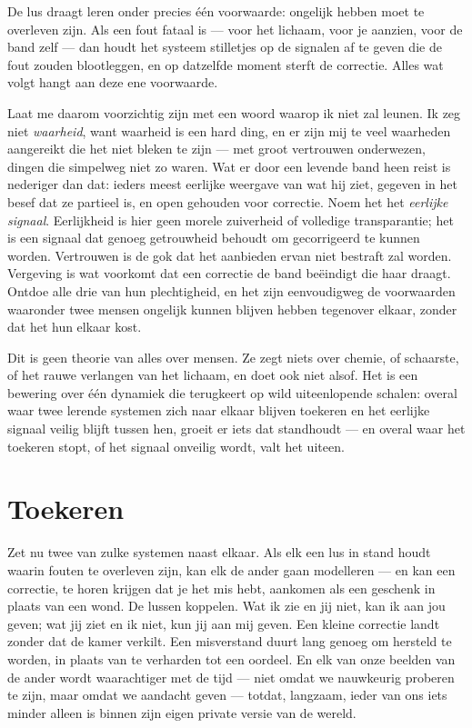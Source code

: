 \documentclass[12pt, a4paper]{article}
\begin{document}
De lus draagt leren onder precies één voorwaarde: ongelijk hebben moet te overleven zijn. Als een fout fataal is — voor het lichaam, voor je aanzien, voor de band zelf — dan houdt het systeem stilletjes op de signalen af te geven die de fout zouden blootleggen, en op datzelfde moment sterft de correctie. Alles wat volgt hangt aan deze ene voorwaarde.

Laat me daarom voorzichtig zijn met een woord waarop ik niet zal leunen. Ik zeg niet \textit{waarheid}, want waarheid is een hard ding, en er zijn mij te veel waarheden aangereikt die het niet bleken te zijn — met groot vertrouwen onderwezen, dingen die simpelweg niet zo waren. Wat er door een levende band heen reist is nederiger dan dat: ieders meest eerlijke weergave van wat hij ziet, gegeven in het besef dat ze partieel is, en open gehouden voor correctie. Noem het het \textit{eerlijke signaal}. Eerlijkheid is hier geen morele zuiverheid of volledige transparantie; het is een signaal dat genoeg getrouwheid behoudt om gecorrigeerd te kunnen worden. Vertrouwen is de gok dat het aanbieden ervan niet bestraft zal worden. Vergeving is wat voorkomt dat een correctie de band beëindigt die haar draagt. Ontdoe alle drie van hun plechtigheid, en het zijn eenvoudigweg de voorwaarden waaronder twee mensen ongelijk kunnen blijven hebben tegenover elkaar, zonder dat het hun elkaar kost.

Dit is geen theorie van alles over mensen. Ze zegt niets over chemie, of schaarste, of het rauwe verlangen van het lichaam, en doet ook niet alsof. Het is een bewering over één dynamiek die terugkeert op wild uiteenlopende schalen: overal waar twee lerende systemen zich naar elkaar blijven toekeren en het eerlijke signaal veilig blijft tussen hen, groeit er iets dat standhoudt — en overal waar het toekeren stopt, of het signaal onveilig wordt, valt het uiteen.

\section*{Toekeren}
Zet nu twee van zulke systemen naast elkaar. Als elk een lus in stand houdt waarin fouten te overleven zijn, kan elk de ander gaan modelleren — en kan een correctie, te horen krijgen dat je het mis hebt, aankomen als een geschenk in plaats van een wond. De lussen koppelen. Wat ik zie en jij niet, kan ik aan jou geven; wat jij ziet en ik niet, kun jij aan mij geven. Een kleine correctie landt zonder dat de kamer verkilt. Een misverstand duurt lang genoeg om hersteld te worden, in plaats van te verharden tot een oordeel. En elk van onze beelden van de ander wordt waarachtiger met de tijd — niet omdat we nauwkeurig proberen te zijn, maar omdat we aandacht geven — totdat, langzaam, ieder van ons iets minder alleen is binnen zijn eigen private versie van de wereld.
\end{document}
